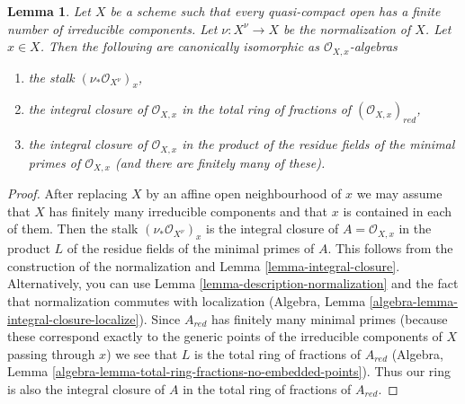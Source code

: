 \documentclass[10pt,a4paper]{amsart}
\theoremstyle{plain}
\newtheorem{lemma}[subsection]{Lemma}
\theoremstyle{definition}
\theoremstyle{remark}
\numberwithin{equation}{subsection}
\begin{document}
\begin{lemma}
\label{lemma-stalk-normalization}
Let $X$ be a scheme such that every quasi-compact open has a finite
number of irreducible components. Let $\nu : X^\nu \to X$
be the normalization of $X$. Let $x \in X$. Then the following
are canonically isomorphic as $\mathcal{O}_{X, x}$-algebras
\begin{enumerate}
\item the stalk $(\nu_*\mathcal{O}_{X^\nu})_x$,
\item the integral closure of $\mathcal{O}_{X, x}$ in
the total ring of fractions of $(\mathcal{O}_{X, x})_{red}$,
\item the integral closure of $\mathcal{O}_{X, x}$ in the product
of the residue fields of the minimal primes of $\mathcal{O}_{X, x}$
(and there are finitely many of these).
\end{enumerate}
\end{lemma}

\begin{proof}
After replacing $X$ by an affine open neighbourhood
of $x$ we may assume that $X$ has finitely many irreducible
components and that $x$ is contained in each of them.
Then the stalk $(\nu_*\mathcal{O}_{X^\nu})_x$ is the
integral closure of $A = \mathcal{O}_{X, x}$ in the product $L$
of the residue fields of the minimal primes of $A$.
This follows from the construction of the normalization and
Lemma \ref{lemma-integral-closure}.
Alternatively, you can use Lemma
\ref{lemma-description-normalization}
and the fact that normalization commutes with localization
(Algebra, Lemma \ref{algebra-lemma-integral-closure-localize}).
Since $A_{red}$ has finitely many minimal primes
(because these correspond exactly to the generic points
of the irreducible components of $X$ passing through $x$)
we see that $L$ is the total ring of fractions of $A_{red}$
(Algebra, Lemma \ref{algebra-lemma-total-ring-fractions-no-embedded-points}).
Thus our ring is also the integral closure of $A$ in the total
ring of fractions of $A_{red}$.
\end{proof}
\end{document}
